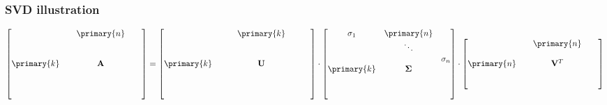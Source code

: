 \begin{frame}[c]
  \frametitle{SVD illustration}
  
  \begin{equation*}
    \begin{bmatrix}
      & & \primary{n} & & \\
      & & & & \\
      & & & & \\
      \primary{k} & & \mathbf{A} & & \\
      & & & & \\
      & & & & \\
      & & & & 
    \end{bmatrix}
    =
    \begin{bmatrix}
      & & & \primary{k} & & & \\
      & & & & & & \\
      & & & & & & \\
      \primary{k} & & & \mathbf{U} & & & \\
      & & & & & & \\
      & & & & & & \\
      & & & & & &
    \end{bmatrix}
    \cdot
    \begin{bmatrix}
      \sigma_1 & \primary{n} & \\
      & \ddots & \\
      & & \sigma_n \\
      \primary{k} & \Msigma & \\
      & & \\
      & & \rule{0mm}{5mm} 
    \end{bmatrix}
    \cdot
    \begin{bmatrix}
      & & \primary{n} & & \\
      & & & & \\
      \primary{n} & & \mathbf{V}^T & & \\
      & & & & \\
      & & & &
    \end{bmatrix}
  \end{equation*}
\end{frame}

